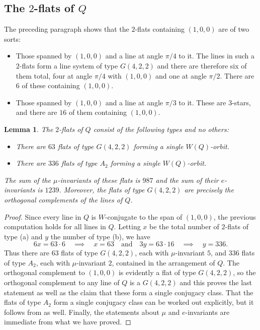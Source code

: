 \documentclass[11pt, reqno]{amsart}
\numberwithin{equation}{section}
\theoremstyle{definition}
\theoremstyle{plain}
\newtheorem{lemma}[theorem]{Lemma}
\begin{document}
\subsection{The $2$-flats of $Q$} 

The preceding paragraph shows that the $2$-flats containing $(1,0,0)$ are of two sorts:
\begin{itemize}
\item[(a)] Those spanned by $(1,0,0)$ and a line at angle $\pi/4$ to it. The lines in such a $2$-flats form a line system of type $G(4,2,2)$ and there are therefore six of them total, four at angle $\pi/4$ with $(1,0,0)$ and one at angle $\pi/2$. There are $6$ of these containing $(1,0,0)$. 

\item[(b)] Those spanned by $(1,0,0)$ and a line at angle $\pi/3$ to it. These are $3$-stars, and there are $16$ of them containing $(1,0,0)$. 
\end{itemize}

\begin{lemma}
The $2$-flats of $Q$ consist of the following types and no others:
\begin{itemize}
\item[(a)] There are $63$ flats of type $G(4,2,2)$ forming a single $W(Q)$-orbit.

\item[(b)] There are $336$ flats of type $A_2$ forming a single $W(Q)$-orbit.
\end{itemize} The sum of the $\mu$-invariants of these flats is $987$ and the sum of their $e$-invariants is $1239$. Moreover, the flats of type $G(4,2,2)$ are precisely the orthogonal complements of the lines of $Q$.
\end{lemma}
\begin{proof}
Since every line in $Q$ is $W$-conjugate to the span of $(1,0,0)$, the previous computation holds for all lines in $Q$. Letting $x$ be the total number of $2$-flats of type (a) and $y$ the number of type (b), we have
$$6x=63 \cdot 6 \quad \implies \quad x=63 \quad \text{and} \quad 3y=63 \cdot16 \quad \implies \quad y=336.$$ Thus there are $63$ flats of type $G(4,2,2)$, each with $\mu$-invariant $5$, and $336$ flats of type $A_2$, each with $\mu$-invariant $2$, contained in the arrangement of $Q$. The orthogonal complement to $(1,0,0)$ is evidently a flat of type $G(4,2,2)$, so the orthogonal complement to any line of $Q$ is a $G(4,2,2)$ and this proves the last statement as well as the claim that these form a single conjugacy class. That the flats of type $A_2$ form a single conjugacy class can be worked out explicitly, but it follows from \cite{BST} as well. Finally, the statements about $\mu$ and $e$-invariants are immediate from what we have proved.
\end{proof}
\end{document}
